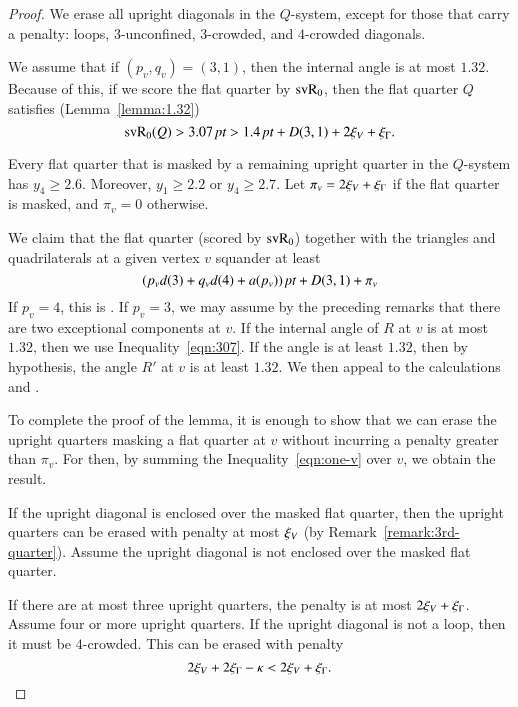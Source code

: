 \begin{proof}   We erase all upright diagonals in the
$Q$-system, except for those that carry a penalty: loops,
$3$-unconfined, $3$-crowded, and $4$-crowded diagonals.

We assume that if $(p_v,q_v)=(3,1)$, then the internal angle is at
most $1.32$. Because of this, if we score the flat quarter by
${\operatorname{svR}}_0$, then the flat quarter $Q$ satisfies
(Lemma~\ref{lemma:1.32})
   \begin{equation}
   {\operatorname{svR}}_0(Q) > 3.07\,\hbox{\it pt} > 1.4\,\hbox{\it pt} + D(3,1) + 2\xi_V + \xi_\Gamma.
   \label{eqn:307}
   \end{equation}



Every flat quarter that is masked by a remaining upright quarter
in the $Q$-system has $y_4\ge2.6$.  Moreover, $y_1\ge2.2$ or
$y_4\ge2.7$.  Let $\pi_v = 2\xi_V + \xi_\Gamma$ if the flat quarter is
masked, and $\pi_v = 0$ otherwise.

We claim that the flat quarter (scored by ${\operatorname{svR}}_0$) together with
the triangles and quadrilaterals at a given vertex $v$ squander at
least
   \begin{equation}
   (p_v d(3) + q_v d(4) + a(p_v))\,\hbox{\it pt} + D(3,1) + \pi_v
   \label{eqn:one-v}
   \end{equation}
If $p_v=4$, this is .  If $p_v=3$, we may assume
by the preceding remarks that there are two exceptional components at
$v$.  If the internal angle of $R$ at $v$ is at most $1.32$, then
we use Inequality~\ref{eqn:307}.  If the angle is at least $1.32$,
then by hypothesis, the angle $R'$ at $v$ is at least $1.32$.  We
then appeal to the calculations  and
.

To complete the proof of the lemma, it is enough to show that we
can erase the upright quarters masking a flat quarter at $v$
without incurring a penalty greater than $\pi_v$.  For then, by
summing the Inequality~\ref{eqn:one-v} over $v$, we obtain the
result.

If the upright diagonal is enclosed over the masked flat quarter,
then the upright quarters can be erased with penalty at most
$\xi_V$ (by Remark~\ref{remark:3rd-quarter}). Assume the upright
diagonal is not enclosed over the masked flat quarter.

If there are at most three upright quarters, the penalty is at
most $2\xi_V + \xi_\Gamma$.  Assume four or more upright quarters.  If
the upright diagonal is not a loop, then it must be $4$-crowded.
This can be erased with penalty
   $$2\xi_V + 2\xi_\Gamma - \kappa < 2\xi_V + \xi_\Gamma.$$


\end{proof}
